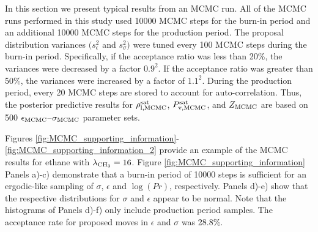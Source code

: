 \documentclass[journal=jctc,manuscript=article]{achemso}
\begin{document}
In this section we present typical results from an MCMC run. All of the MCMC runs performed in this study used 10000 MCMC steps for the burn-in period and an additional 10000 MCMC steps for the production period. The proposal distribution variances $(s^2_{\epsilon}$ and $s^2_{\sigma})$ were tuned every 100 MCMC steps during the burn-in period. Specifically, if the acceptance ratio was less than 20\%, the variances were decreased by a factor $0.9^2$. If the acceptance ratio was greater than 50\%, the variances were increased by a factor of $1.1^2$. During the production period, every 20 MCMC steps are stored to account for auto-correlation. Thus, the posterior predictive results for $\rho_{\rm l, MCMC}^{\rm sat}$, $P_{\rm v, MCMC}^{\rm sat}$, and $Z_{\rm MCMC}$ are based on 500 $\epsilon_{\rm MCMC}$--$\sigma_{\rm MCMC}$ parameter sets. 

Figures \ref{fig:MCMC_supporting_information}-\ref{fig:MCMC_supporting_information_2} provide an example of the MCMC results for ethane with $\lambda_{\rm CH_3} = 16$. Figure \ref{fig:MCMC_supporting_information} Panels a)-c) demonstrate that a burn-in period of 10000 steps is sufficient for an ergodic-like sampling of $\sigma$, $\epsilon$ and $\log(Pr)$, respectively. Panels d)-e) show that the respective distributions for $\sigma$ and $\epsilon$ appear to be normal. Note that the histograms of Panels d)-f) only include production period samples. The acceptance rate for proposed moves in $\epsilon$ and $\sigma$ was 28.8\%. 
\end{document}
